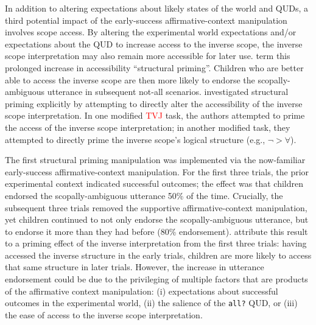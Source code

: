 \documentclass[preprint,authoryear]{elsarticle}\frenchspacing
\newcommand{\lp}[1]{\textcolor{red}{#1}} %
\begin{document}
In addition to altering expectations about likely states of the world and QUDs, a third potential impact of the early-success affirmative-context manipulation involves scope access. By  altering the experimental world expectations and/or expectations about the QUD to increase access to the inverse scope, the inverse scope interpretation may also remain more accessible for later use.  \cite{viauetal2010} term this prolonged increase in accessibility ``structural priming''.  Children who are better able to access the inverse scope are then more likely to endorse the scopally-ambiguous utterance in subsequent {not-all} scenarios. \citeauthor{viauetal2010} investigated structural priming explicitly by attempting to directly alter the accessibility of the inverse scope interpretation. In one modified 
\lp{TVJ}
task, the authors attempted to prime the access of the inverse scope interpretation; in another modified task, they attempted to directly prime the inverse scope's logical structure (e.g., $\neg>\forall$).

The first structural priming manipulation was implemented via the now-familiar early-success affirmative-context manipulation. For the first three trials, the  prior experimental context indicated successful outcomes; the effect was that children endorsed the scopally-ambiguous utterance 50\% of the time. Crucially, the subsequent three trials removed the supportive affirmative-context manipulation, yet children continued to not only endorse the scopally-ambiguous utterance, but to endorse it more than they had before (80\% endorsement). \cite{viauetal2010} attribute this result to a priming effect of the inverse interpretation from the first three trials: having accessed the inverse structure in the early trials, children are more likely to access that same structure in later trials. However, the increase in utterance endorsement could be due to the privileging of multiple  factors that are products of the affirmative context manipulation: (i) expectations about successful outcomes in the experimental world, (ii)  the salience of the \texttt{all?} QUD, or (iii)  the ease of access to the inverse scope interpretation. 
\end{document}
